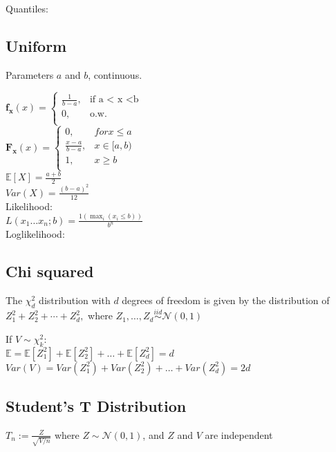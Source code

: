 Quantiles:\\

\subsection*{Uniform}

Parameters $a$ and $b$, continuous.

$ \mathbf{f_x}(x)=
	\begin{cases}
		 \frac{1}{b-a},&\text{if a < x <b}\\
		0,&\text{o.w.}\\
	\end{cases}
$\\

$ \mathbf{F_x}(x)=
	\begin{cases}
		 0,&for x \leq a\\
		 \frac{x-a}{b-a},& x \in [a,b)\\
		1,&x \geq b\\
	\end{cases}
$\\


$\mathbb{E}[X]=\frac{a+b}{2}$\\
$Var(X)=\frac{(b-a)^2}{12}$\\

Likelihood:\\
$L(x_1\dots x_n;b)=\frac{1(\max_i (x_i \leq b))} {b^n}$\\

Loglikelihood:\\


\subsection*{Chi squared}
The $\chi _ d^2$ distribution with $d$ degrees of freedom is given by the distribution of $Z_1^2 + Z_2^2 + \cdots + Z_ d^2,$ where $Z_1, \ldots , Z_ d \stackrel{iid}{\sim } \mathcal{N}(0,1)$

If $V \sim \chi^2_k:$\\

$\mathbb{E}= \mathbb{E}[Z_1^2] + \mathbb{E}[Z_2^2] + \ldots + \mathbb{E}[Z_d^2] = d$\\ 

$Var(V) = Var(Z_1^2) + Var(Z_2^2) + \ldots + Var(Z_d^2) = 2d$

\subsection*{Student's T Distribution}

$T_ n := \frac{Z}{\sqrt{V/n}}$ where $Z \sim \mathcal{N}(0,1)$, and $Z$ and $V$ are independent
